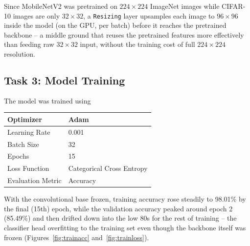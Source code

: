 \documentclass[11pt]{article}
\begin{document}
Since MobileNetV2 was pretrained on $224\times224$ ImageNet images while
CIFAR-10 images are only $32\times32$, a \texttt{Resizing} layer upsamples
each image to $96\times96$ inside the model (on the GPU, per batch) before
it reaches the pretrained backbone -- a middle ground that reuses the
pretrained features more effectively than feeding raw $32\times32$ input,
without the training cost of full $224\times224$ resolution.


\subsection*{Task 3: Model Training}

The model was trained using

\begin{center}

\begin{tabular}{|p{5cm}|p{6cm}|}

\hline

Optimizer & Adam\\

\hline

Learning Rate & 0.001\\

\hline

Batch Size & 32\\

\hline

Epochs & 15\\

\hline

Loss Function & Categorical Cross Entropy\\

\hline

Evaluation Metric & Accuracy\\

\hline

\end{tabular}

\end{center}

With the convolutional base frozen, training accuracy rose steadily to
98.01\% by the final (15th) epoch, while the validation accuracy peaked around
epoch 2 (85.49\%) and then drifted down into the low 80s for the rest of
training -- the classifier head overfitting to the training set even
though the backbone itself was frozen (Figures~\ref{fig:trainacc}
and~\ref{fig:trainloss}).
\end{document}
